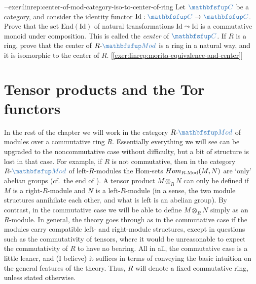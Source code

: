 \begin{exer}{$\lnot$}{exer:linrep:center-of-mod-category-iso-to-center-of-ring}
  Let $\categ{C}$ be a category, and consider the identity functor
  $\mathrm{Id} : \categ{C} \to \categ{C}$. Prove that the set
  $\mathrm{End}(\mathrm{Id})$ of natural transformations
  $\mathrm{Id} \leadsto \mathrm{Id}$ is a commutative monoid under
  composition. This is called the \emph{center} of $\categ{C}$. If $R$
  is a ring, prove that the center of $R\text{-}\categ{Mod}$ is
  a ring in a natural way, and it is isomorphic to the center of
  $R$. [\ref{exer:linrep:morita-equivalence-and-center}]
\end{exer}

\section{Tensor products and the Tor functors}%
\label{sec:linrep:tensor-products-and-the-tor-functors}

In the rest of the chapter we will work in the category
$R\text{-}\categ{Mod}$ of modules over a commutative ring
$R$. Essentially everything we will see can be upgraded to the
noncommutative case without difficulty, but a bit of structure is lost
in that case. For example, if $R$ is not commutative, then in the
category $R\text{-}\categ{Mod}$ of left-$R$-modules the Hom-sets
$Hom_{R\text{-}\mathrm{Mod}} (M, N)$ are `only' abelian groups (cf.\
the end of ). A tensor
product $M \otimes_R N$ can only be defined if $M$ is a
right-$R$-module and $N$ is a left-$R$-module (in a sense, the two
module structures annihilate each other, and what is left is an
abelian group). By contrast, in the commutative case we will be able
to define $M \otimes_R N$ simply as an $R$-module. In general, the
theory goes through as in the commutative case if the modules carry
compatible left- and right-module structures, except in questions such
as the commutativity of tensors, where it would be unreasonable to
expect the commutativity of $R$ to have no bearing. All in all, the
commutative case is a little leaner, and (I believe) it suffices in
terms of conveying the basic intuition on the general features of the
theory.  Thus, $R$ will denote a fixed commutative ring, unless stated
otherwise.

